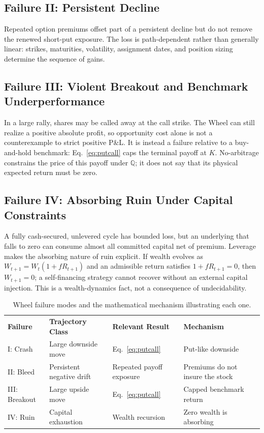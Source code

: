 \documentclass[aps,pra,reprint,superscriptaddress,amsmath,amssymb,floatfix]{revtex4-2}
\theoremstyle{plain}
\theoremstyle{definition}
\theoremstyle{remark}
\begin{document}
\subsection{Failure II: Persistent Decline}

Repeated option premiums offset part of a persistent decline but do not remove
the renewed short-put exposure. The loss is path-dependent rather than
generally linear: strikes, maturities, volatility, assignment dates, and
position sizing determine the sequence of gains.

\subsection{Failure III: Violent Breakout and Benchmark Underperformance}

In a large rally, shares may be called away at the call strike. The Wheel can
still realize a positive absolute profit, so opportunity cost alone is not a
counterexample to strict positive P\&L. It is instead a failure relative to a
buy-and-hold benchmark: Eq.~\eqref{eq:putcall} caps the terminal payoff at
\(K\). No-arbitrage constrains the price of this payoff under
\(\mathbb{Q}\); it does not say that its physical expected return must be zero.

\subsection{Failure IV: Absorbing Ruin Under Capital Constraints}

A fully cash-secured, unlevered cycle has bounded loss, but an underlying that
falls to zero can consume almost all committed capital net of premium.
Leverage makes the absorbing nature of ruin explicit. If wealth evolves as
\(W_{t+1}=W_t(1+fR_{t+1})\) and an admissible return satisfies
\(1+fR_{t+1}=0\), then \(W_{t+1}=0\); a self-financing strategy cannot recover
without an external capital injection. This is a wealth-dynamics fact, not a
consequence of undecidability.

\begin{table}[ht]
\caption{\label{tab:failuremodes}Wheel failure modes and the mathematical mechanism illustrating each one.}
\begin{ruledtabular}
\begin{tabular*}{\textwidth}{@{\extracolsep{\fill}}llll}
\textbf{Failure} & \textbf{Trajectory Class} & \textbf{Relevant Result} & \textbf{Mechanism} \\
\colrule
I: Crash & Large downside move & Eq.~\eqref{eq:putcall} & Put-like downside \\
II: Bleed & Persistent negative drift & Repeated payoff exposure & Premiums do not insure the stock \\
III: Breakout & Large upside move & Eq.~\eqref{eq:putcall} & Capped benchmark return \\
IV: Ruin & Capital exhaustion & Wealth recursion & Zero wealth is absorbing \\
\end{tabular*}
\end{ruledtabular}
\end{table}
\end{document}
